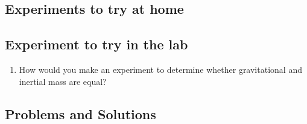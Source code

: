 \subsection{Experiments to try at home}

\subsection{Experiment to try in the lab}
\begin{enumerate}
\item How would you make an experiment to determine whether gravitational and inertial mass are equal?
\end{enumerate}

\subsection{Problems and Solutions}
 \vspace{0.25cm}
